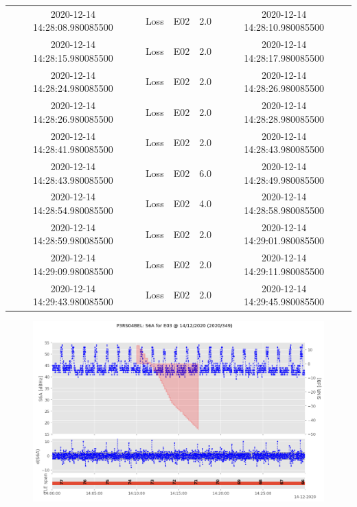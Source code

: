 \begin{enumerate}
\begin{longtabu}{ccccc}
2020{-}12{-}14 14:28:08.980085500&Loss&E02&2.0&2020{-}12{-}14 14:28:10.980085500\\%
2020{-}12{-}14 14:28:15.980085500&Loss&E02&2.0&2020{-}12{-}14 14:28:17.980085500\\%
2020{-}12{-}14 14:28:24.980085500&Loss&E02&2.0&2020{-}12{-}14 14:28:26.980085500\\%
2020{-}12{-}14 14:28:26.980085500&Loss&E02&2.0&2020{-}12{-}14 14:28:28.980085500\\%
2020{-}12{-}14 14:28:41.980085500&Loss&E02&2.0&2020{-}12{-}14 14:28:43.980085500\\%
2020{-}12{-}14 14:28:43.980085500&Loss&E02&6.0&2020{-}12{-}14 14:28:49.980085500\\%
2020{-}12{-}14 14:28:54.980085500&Loss&E02&4.0&2020{-}12{-}14 14:28:58.980085500\\%
2020{-}12{-}14 14:28:59.980085500&Loss&E02&2.0&2020{-}12{-}14 14:29:01.980085500\\%
2020{-}12{-}14 14:29:09.980085500&Loss&E02&2.0&2020{-}12{-}14 14:29:11.980085500\\%
2020{-}12{-}14 14:29:43.980085500&Loss&E02&2.0&2020{-}12{-}14 14:29:45.980085500\\%
\hline%
\end{longtabu}%


\begin{figure}[H]%
\centering%
\includegraphics[width=0.95\linewidth]{png/P3RS04BEL_R_20203490000_01D_00U_MO_E-S6A-E03.png}%
\end{figure}


\end{enumerate}
